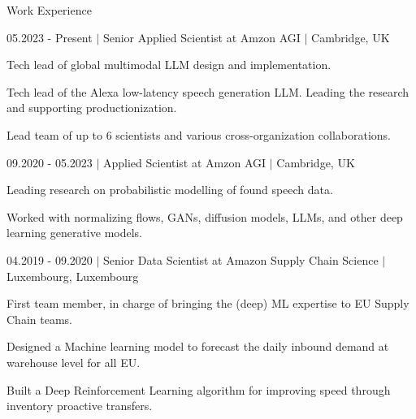 \documentclass{resume} %
\begin{document}
\begin{rSection}{Work Experience} \itemsep -1pt
	
\begin{rSubsection}{05.2023 - Present $|$ Senior Applied Scientist at Amzon AGI  $|$  \textnormal{Cambridge, UK}}{}{}

	\vspace{-3pt}
	
	\item Tech lead of global multimodal LLM design and implementation.
	\item Tech lead of the Alexa low-latency  speech generation LLM. Leading the research and supporting productionization.
	\item Lead team of up to 6 scientists and various cross-organization collaborations.
	
\end{rSubsection}

	\vspace{-3pt}

\begin{rSubsection}{09.2020 - 05.2023 $|$ Applied Scientist at Amzon AGI  $|$  \textnormal{Cambridge, UK}}{}{}
	
	\vspace{-3pt}
	
	\item Leading research on probabilistic modelling of found speech data.
	\item Worked with normalizing flows, GANs, diffusion models, LLMs, and other deep learning generative models.

\end{rSubsection}

	\vspace{-3pt}

\begin{rSubsection}{04.2019 - 09.2020 $|$ Senior Data Scientist at Amazon Supply Chain Science  $|$  \textnormal{Luxembourg, Luxembourg}}{}{}

	\vspace{-3pt}

	\item First team member, in charge of bringing the (deep) ML expertise to EU Supply Chain teams.
	\item Designed a Machine learning model to  forecast the daily inbound demand at warehouse level for all EU.
	\item Built a Deep Reinforcement Learning algorithm for improving speed through inventory proactive transfers.
	

\end{rSubsection}
\end{rSection}
\end{document}
